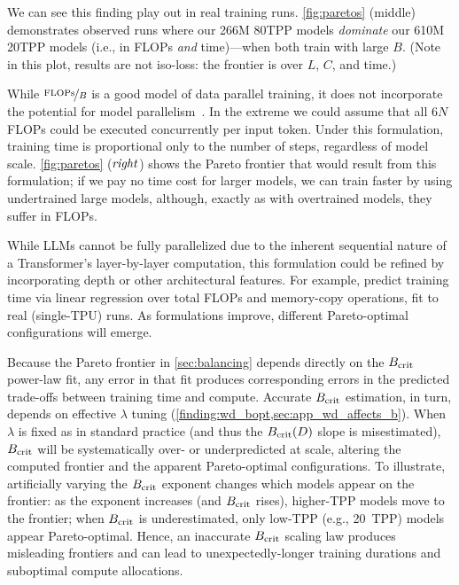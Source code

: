 We can see this finding play out in real training runs.
\cref{fig:paretos} (middle) demonstrates observed runs where our 266M
80TPP models \emph{dominate} our 610M 20TPP models (i.e., in FLOPs
\emph{and} time)---when both train with large $B$.  (Note in this
plot, results are not iso-loss: the frontier is over $L$, $C$, and
time.)


While $\nicefrac{\text{FLOPs}}{B}$ is a good model of data parallel
training, it does not incorporate the potential for model
parallelism~\citep{smith2022using}.
%
In the extreme we could assume that all $6N$ FLOPs could be executed
concurrently per input token.  Under this formulation, training time
is proportional only to the number of steps, regardless of model
scale.
%
\cref{fig:paretos} ($\text{\emph{right}}$) shows the Pareto frontier that would
result from this formulation; if we pay no time cost for larger
models, we can train faster by using undertrained large models,
although, exactly as with overtrained models, they suffer in FLOPs.

While LLMs cannot be fully parallelized due to the inherent sequential
nature of a Transformer's layer-by-layer computation, this formulation
could be refined by incorporating depth or other architectural
features.
%
For example, \citet{inbar2024time} predict training time via linear
regression over total FLOPs and memory-copy operations, fit to real
(single-TPU) runs.
%
As formulations improve, different Pareto-optimal configurations will emerge.


Because the Pareto frontier in \cref{sec:balancing} depends directly
on the $B_{\text{crit}}$ power-law fit, any error in that fit produces
corresponding errors in the predicted trade-offs between training time
and compute.  Accurate $B_{\text{crit}}$ estimation, in turn, depends on
effective $\lambda$ tuning
(\cref{finding:wd_bopt,sec:app_wd_affects_b}).  When $\lambda$ is
fixed as in standard practice (and thus the $B_{\text{crit}}(D)$ slope is
misestimated), $B_{\text{crit}}$ will be systematically over- or underpredicted
at scale, altering the computed frontier and the apparent
Pareto-optimal configurations.
%
To illustrate, artificially varying the $B_{\text{crit}}$ exponent changes
which models appear on the frontier: as the exponent increases (and
$B_{\text{crit}}$ rises), higher-TPP models move to the frontier; when $B_{\text{crit}}$
is underestimated, only low-TPP (e.g., 20~TPP) models appear
Pareto-optimal.  Hence, an inaccurate $B_{\text{crit}}$ scaling law produces
misleading frontiers and can lead to unexpectedly-longer training
durations and suboptimal compute allocations.

